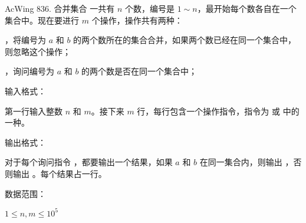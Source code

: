 \begin{titledbox}{AcWing 836. 合并集合}
    一共有 $n$ 个数，编号是 $1 \sim n$，最开始每个数各自在一个集合中。现在要进行 $m$ 个操作，操作共有两种：
    \begin{myenum}
        \item {}，将编号为 $a$ 和 $b$ 的两个数所在的集合合并，如果两个数已经在同一个集合中，则忽略这个操作；
        \item {}，询问编号为 $a$ 和 $b$ 的两个数是否在同一个集合中；
    \end{myenum}

    输入格式：

    第一行输入整数 $n$ 和 $m$。接下来 $m$ 行，每行包含一个操作指令，指令为  或  中的一种。

    输出格式：

    对于每个询问指令 ，都要输出一个结果，如果 $a$ 和 $b$ 在同一集合内，则输出 ，否则输出 。每个结果占一行。

    数据范围：

    $1 \le n,m \le 10^5$

    \begin{inputblock}
         \\
         \\
         \\
         \\
         \\
    \end{inputblock}
    \begin{outputblock}
         \\
         \\
    \end{outputblock}
\end{titledbox}


